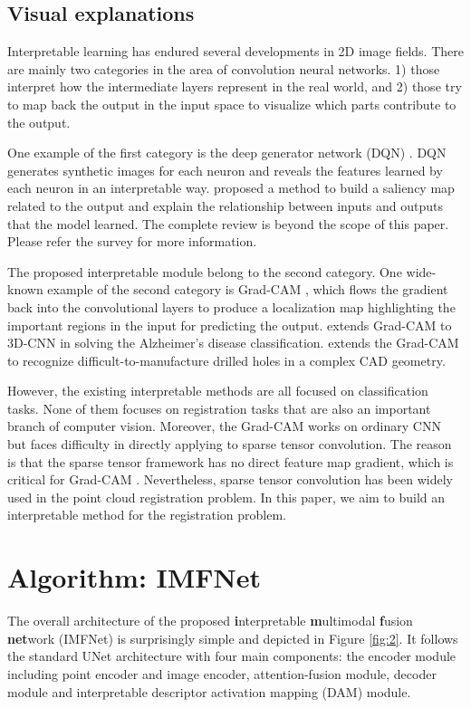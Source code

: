 \documentclass[10pt,twocolumn,letterpaper]{article}
\begin{document}
\subsection{Visual explanations}
Interpretable learning has endured several developments in 2D image fields. There are mainly two categories in the area of convolution neural networks. 1)  those interpret how the intermediate layers represent in the real world, and 2) those try to map back the output in the input space to visualize which parts contribute to the output.

One example of the first category is the deep generator network (DQN) \cite{nguyen2016synthesizing}. DQN generates synthetic images for each neuron and reveals the features learned by each neuron in an interpretable way.  \cite{dabkowski2017real} proposed a method to build a saliency map related to the output and explain the relationship between inputs and outputs that the model learned. 
The complete review is beyond the scope of this paper. Please refer the survey \cite{arrieta2020explainable} for more information.

The proposed interpretable module belong to the second category. One wide-known example of the second category is Grad-CAM \cite{selvaraju2017grad}, which flows the gradient back into the convolutional layers to produce a localization map highlighting the important regions in the input for predicting the output. \cite{yang2018visual} extends Grad-CAM to 3D-CNN in solving the Alzheimer’s disease classification. \cite{ghadai2018learning} extends the Grad-CAM to recognize difficult-to-manufacture drilled holes in a complex CAD geometry. 

However, the existing interpretable methods are all focused on classification tasks. None of them focuses on registration tasks that are also an important branch of computer vision. Moreover, the Grad-CAM works on ordinary CNN but faces difficulty in directly applying to sparse tensor convolution. The reason is that the sparse tensor framework has no direct feature map gradient, which is critical for Grad-CAM \cite{choy2019fully}. Nevertheless, sparse tensor convolution has been widely used in the point cloud registration problem. In this paper, we aim to build an interpretable method for the registration problem.





\section{Algorithm: IMFNet}
The overall architecture of the proposed \textbf{i}nterpretable \textbf{m}ultimodal \textbf{f}usion \textbf{net}work (IMFNet) is surprisingly simple and depicted in Figure \ref{fig:2}. It follows the standard UNet architecture with four main components: the encoder module including point encoder and image encoder, attention-fusion module, decoder module and interpretable descriptor activation mapping (DAM) module. 
\end{document}
